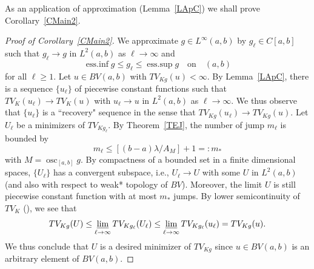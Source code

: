 \documentclass[12pt, reqno]{amsart}
\numberwithin{equation}{section}
\DeclareMathOperator*{\osc}{osc}
\DeclareMathOperator*{\essinf}{ess.inf}
\DeclareMathOperator*{\esssup}{ess.sup}
\begin{document}
As an application of approximation (Lemma~\ref{LApC}) we shall prove Corollary~\ref{CMain2}.

\begin{proof}[Proof of Corollary~\ref{CMain2}]
We approximate $g\in L^\infty(a,b)$ by $g_\ell\in C[a,b]$ such that $g_\ell\to g$ in $L^2(a,b)$ as $\ell\to\infty$ and
\[
    \essinf g \le g_\ell \le \esssup g
    \quad\text{on}\quad (a,b)
\]
for all $\ell\ge1$.
 Let $u\in BV(a,b)$ with $TV_{Kg}(u)<\infty$.
 By Lemma~\ref{LApC}, there is a sequence $\{u_\ell\}$ of piecewise constant functions such that $TV_K(u_\ell)\to TV_K(u)$ with $u_\ell\to u$ in $L^2(a,b)$ as $\ell\to\infty$.
 We thus observe that $\{u_\ell\}$ is a ``recovery" sequence in the sense that $TV_{Kg}(u_\ell)\to TV_{Kg}(u)$.
 Let $U_\ell$ be a minimizers of $TV_{Kg_\ell}$.
 By Theorem~\ref{TEJ}, the number of jump $m_\ell$ is bounded by
\[
    m_\ell \le \left[ (b-a)\lambda / A_M \right] + 1 =: m_* 
\]
with $M=\osc_{[a,b]}g$.
 By compactness of a bounded set in a finite dimensional spaces, $\{U_\ell\}$ has a convergent subspace, i.e., $U_\ell\to U$ with some $U$ in $L^2(a,b)$ (and also with respect to weak* topology of $BV$).
 Moreover, the limit $U$ is still piecewise constant function with at most $m_*$ jumps.
 By lower semicontinuity of $TV_K$ (\cite[Proposition 2.4]{GKKOS}), we see that
\[
    TV_{Kg}(U) \le \varliminf_{\ell\to\infty} TV_{Kg_\ell}(U_\ell)
    \le \varliminf_{\ell\to\infty} TV_{Kg_\ell}(u_\ell) = TV_{Kg}(u).
\]
We thus conclude that $U$ is a desired minimizer of $TV_{Kg}$ since $u\in BV(a,b)$ is an arbitrary element of $BV(a,b)$.
\end{proof}
\end{document}
